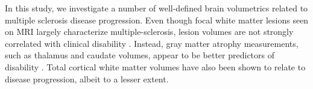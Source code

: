 In this study, we investigate a number of well-defined brain volumetrics related to multiple sclerosis disease progression. Even though focal white matter lesions seen on MRI largely characterize multiple-sclerosis, lesion volumes are not strongly correlated with clinical disability \cite{lesions1,lesions2,lesions3}. Instead, gray matter atrophy measurements, such as thalamus \cite{thal1,thal2,thal3,thal4} and caudate \cite{caud1,caud2} volumes, appear to be better predictors of disability \cite{gm1,gm2,gm3,gm4}. Total cortical white matter volumes \cite{white1} have also been shown to relate to disease progression, albeit to a lesser extent. %